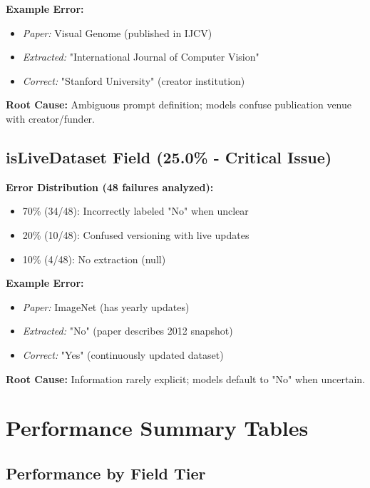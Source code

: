\documentclass[11pt,a4paper]{article}
\begin{document}
\textbf{Example Error:}
\begin{itemize}
    \item \textit{Paper:} Visual Genome (published in IJCV)
    \item \textit{Extracted:} "International Journal of Computer Vision"
    \item \textit{Correct:} "Stanford University" (creator institution)
\end{itemize}

\textbf{Root Cause:} Ambiguous prompt definition; models confuse publication venue with creator/funder.

\subsection{isLiveDataset Field (25.0\% - Critical Issue)}

\textbf{Error Distribution (48 failures analyzed):}
\begin{itemize}
    \item 70\% (34/48): Incorrectly labeled "No" when unclear
    \item 20\% (10/48): Confused versioning with live updates
    \item 10\% (4/48): No extraction (null)
\end{itemize}

\textbf{Example Error:}
\begin{itemize}
    \item \textit{Paper:} ImageNet (has yearly updates)
    \item \textit{Extracted:} "No" (paper describes 2012 snapshot)
    \item \textit{Correct:} "Yes" (continuously updated dataset)
\end{itemize}

\textbf{Root Cause:} Information rarely explicit; models default to "No" when uncertain.

\section{Performance Summary Tables}

\subsection{Performance by Field Tier}
\end{document}
